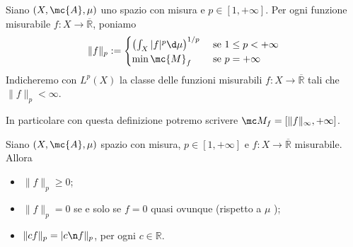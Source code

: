 \begin{boxdef}
    Siano $(X, \mc{A}, \mu)$ uno spazio con misura e $p \in[1,+\infty]$. Per ogni funzione misurabile $f: X \rightarrow \overline{\mathbb{R}}$, poniamo
    \[
    \|f\|_{p}:= \begin{cases}\left(\int_{X}|f|^{p} \d \mu\right)^{1 / p} & \text { se } 1 \leq p<+\infty \\ \min \mc{M}_{f} & \text { se } p=+\infty\end{cases}
    \]
    Indicheremo con $L^{p}(X)$ la classe delle funzioni misurabili $f: X \rightarrow \overline{\mathbb{R}}$ tali che $\|f\|_{p}<\infty$.
\end{boxdef}
In particolare con questa definizione potremo scrivere $\mc M_f =[\|f\|_\infty, +\infty] $.
\begin{shadedTheorem}[$*$]\label{thm: 3.1 pre-norma Lp}
    Siano $(X, \mc{A}, \mu)$ spazio con misura, $p \in[1,+\infty]$ e $f: X \rightarrow \overline{\mathbb{R}}$ misurabile. Allora
    \begin{itemize}
        \item $\|f\|_{p} \geq 0$;
        \item $\|f\|_{p}=0$ se e solo se $f=0$ quasi ovunque (rispetto a $\mu$ );
        \item $\|c f\|_{p}=|c\n f\|_{p}$, per ogni $c \in \mathbb{R}$.
    \end{itemize}
\end{shadedTheorem}

